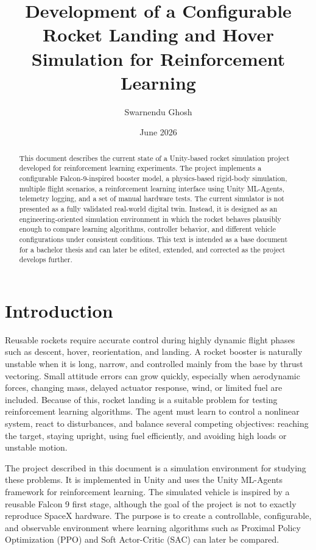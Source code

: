 \documentclass[12pt,a4paper]{article}
\title{Development of a Configurable Rocket Landing and Hover Simulation for Reinforcement Learning}
\author{Swarnendu Ghosh}
\date{June 2026}
\begin{document}
\maketitle

\begin{abstract}
This document describes the current state of a Unity-based rocket simulation project developed for reinforcement learning experiments. The project implements a configurable Falcon-9-inspired booster model, a physics-based rigid-body simulation, multiple flight scenarios, a reinforcement learning interface using Unity ML-Agents, telemetry logging, and a set of manual hardware tests. The current simulator is not presented as a fully validated real-world digital twin. Instead, it is designed as an engineering-oriented simulation environment in which the rocket behaves plausibly enough to compare learning algorithms, controller behavior, and different vehicle configurations under consistent conditions. This text is intended as a base document for a bachelor thesis and can later be edited, extended, and corrected as the project develops further.
\end{abstract}

\tableofcontents
\newpage

\section{Introduction}

Reusable rockets require accurate control during highly dynamic flight phases such as descent, hover, reorientation, and landing. A rocket booster is naturally unstable when it is long, narrow, and controlled mainly from the base by thrust vectoring. Small attitude errors can grow quickly, especially when aerodynamic forces, changing mass, delayed actuator response, wind, or limited fuel are included. Because of this, rocket landing is a suitable problem for testing reinforcement learning algorithms. The agent must learn to control a nonlinear system, react to disturbances, and balance several competing objectives: reaching the target, staying upright, using fuel efficiently, and avoiding high loads or unstable motion.

The project described in this document is a simulation environment for studying these problems. It is implemented in Unity and uses the Unity ML-Agents framework for reinforcement learning. The simulated vehicle is inspired by a reusable Falcon 9 first stage, although the goal of the project is not to exactly reproduce SpaceX hardware. The purpose is to create a controllable, configurable, and observable environment where learning algorithms such as Proximal Policy Optimization (PPO) and Soft Actor-Critic (SAC) can later be compared.
\end{document}
